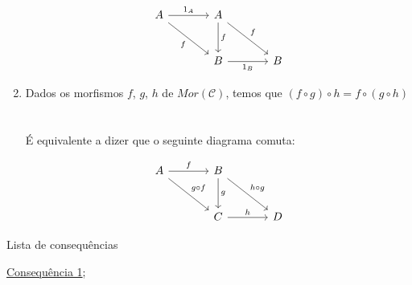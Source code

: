 \begin{defi}[Categorias]
\begin{enumerate}
\[\begin{tikzcd}[sep=large]
	A & A \\
	& B & B
	\arrow["{1_A}", from=1-1, to=1-2]
	\arrow["f"', from=1-1, to=2-2]
	\arrow["f", from=1-2, to=2-2]
	\arrow["f", from=1-2, to=2-3]
	\arrow["{1_B}"', from=2-2, to=2-3]
\end{tikzcd}\]
\item Dados os morfismos $f$, $g$, $h$ de $Mor(\mathcal{C})$, temos que 
$(f \circ g) \circ h = f \circ (g \circ h)$
\\
\\
\\
É equivalente a dizer que o seguinte diagrama comuta:

\[\begin{tikzcd}[sep=large]
	A & B \\
	& C & D
	\arrow["f", from=1-1, to=1-2]
	\arrow["{g \circ f}", from=1-1, to=2-2]
	\arrow["g", from=1-2, to=2-2]
	\arrow["{h \circ g}", from=1-2, to=2-3]
	\arrow["h", from=2-2, to=2-3]
\end{tikzcd}\]
\end{enumerate}
\end{defi}


\begin{titlemize}{Lista de consequências}
	\item \hyperref[consequencia1]{Consequência 1};\\ %
	\item \hyperref[]{}
\end{titlemize}

